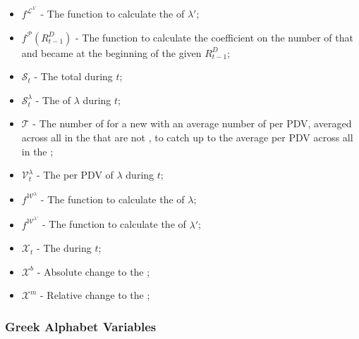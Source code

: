 \documentclass[class=article, crop=false]{standalone}
\begin{document}
\begin{itemize}[topsep=0pt, itemsep=3pt,leftmargin=16pt]
    \item[] $f^{\mathscr{L}^{\lambda'}}$ - The function to calculate the  of $\lambda'$;
    \item[] $f^{\mathscr{P}}(R_{t-1}^{D})$ - The function to calculate the coefficient on the number of  that  and became  at the beginning of the  given $R_{t-1}^{D}$;
    \item[] $\mathscr{S}_{t}$ - The total  during $t$;
    \item[] $\mathscr{S}_{t}^{\lambda}$ - The  of $\lambda$ during $t$;
    \item[] $\mathscr{T}$ - The number of  for a new  with an average number of  per PDV, averaged across all  in the  that are not , to catch up to the average  per PDV across all  in the ;
    \item[] $\mathscr{V}_{t}^{\lambda}$ - The  per PDV of $\lambda$ during $t$;
    \item[] $f^{\mathscr{W}^{\lambda}}$ - The function to calculate the  of $\lambda$;
    \item[] $f^{\mathscr{W}^{\lambda'}}$ - The function to calculate the  of $\lambda'$;
    \item[] $\mathscr{X}_{t}$ - The  during $t$;
    \item[] $\mathscr{X}^{b}$ - Absolute change to the ;
    \item[] $\mathscr{X}^{m}$ - Relative change to the ;
\end{itemize}


\subsubsection{Greek Alphabet Variables}
\end{document}
